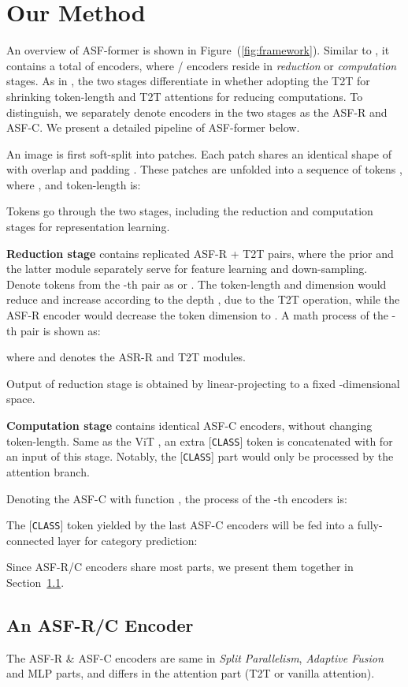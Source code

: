 \documentclass[lettersize,journal]{IEEEtran}
\begin{document}
\section{Our Method}
An overview of ASF-former is shown in Figure~(\ref{fig:framework}). Similar to \cite{Xu2021ViTAEVT,yuan2021tokens}, it contains a total of  encoders, where / encoders reside in \textit{reduction} or \textit{computation} stages. As in \cite{yuan2021tokens}, the two stages differentiate in whether adopting the T2T for shrinking token-length and T2T attentions for reducing computations. To distinguish, we separately denote encoders in the two stages as the ASF-R and ASF-C. We present a detailed pipeline of ASF-former below.

An image  is first soft-split into patches. Each patch shares an identical shape of  with overlap  and padding . These patches are unfolded into a sequence of tokens , where , and token-length is:

Tokens  go through the two stages, including the reduction and computation stages for representation learning.  

\textbf{Reduction stage} contains  replicated ASF-R + T2T pairs, where the prior and the latter module separately serve for feature learning and down-sampling. Denote tokens from the -th pair as   or  . The token-length  and dimension  would reduce and increase according to the depth , due to the T2T operation, while the ASF-R encoder would decrease the token dimension to . A math process of the -th pair is shown as:

where  and  denotes the ASR-R and T2T modules.

Output  of reduction stage is obtained by linear-projecting  to a fixed -dimensional space.


\textbf{Computation stage} contains  identical ASF-C encoders, without changing token-length. Same as the ViT \cite{dosovitskiy2021an}, an extra [{\tt CLASS}] token  is concatenated with  for an input  of this stage. Notably, the [{\tt CLASS}] part would only be processed by the attention branch.

Denoting the ASF-C with function , the process of the -th encoders is:


The [{\tt CLASS}] token yielded by the last ASF-C encoders will be fed into a fully-connected layer for category prediction:


Since ASF-R/C encoders share most parts, we present them together in Section~\ref{sec:enc}. 

\subsection{An ASF-R/C Encoder}
\label{sec:enc}
The ASF-R \& ASF-C encoders are same in \textit{Split Parallelism}, \textit{Adaptive Fusion} and MLP parts, and differs in the attention part (T2T or vanilla attention).
\end{document}
